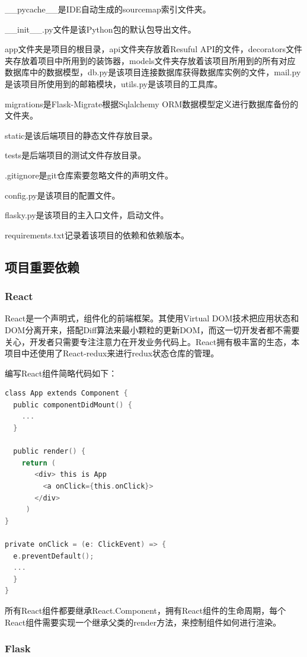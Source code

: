 \_\_pycache\_\_是IDE自动生成的sourcemap索引文件夹。

\_\_init\_\_.py文件是该Python包的默认包导出文件。

app文件夹是项目的根目录，api文件夹存放着Resuful API的文件，decorators文件夹存放着项目中所用到的装饰器，models文件夹存放着该项目所用到的所有对应数据库中的数据模型，db.py是该项目连接数据库获得数据库实例的文件，mail.py是该项目所使用到的邮箱模块，utils.py是该项目的工具库。

migrations是Flask-Migrate根据Sqlalchemy ORM数据模型定义进行数据库备份的文件夹。

static是该后端项目的静态文件存放目录。

tests是后端项目的测试文件存放目录。

.gitignore是git仓库索要忽略文件的声明文件。

config.py是该项目的配置文件。

flasky.py是该项目的主入口文件，启动文件。

requirements.txt记录着该项目的依赖和依赖版本。

\subsection{项目重要依赖}

\subsubsection{React}

React是一个声明式，组件化的前端框架。其使用Virtual DOM技术把应用状态和DOM分离开来，搭配Diff算法来最小颗粒的更新DOM，而这一切开发者都不需要关心，开发者只需要专注注意力在开发业务代码上。React拥有极丰富的生态，本项目中还使用了React-redux来进行redux状态仓库的管理。

编写React组件简略代码如下：
\begin{lstlisting}[language=C]
class App extends Component {
  public componentDidMount() {
    ...
  }

  public render() {
    return (
       <div> this is App
         <a onClick={this.onClick}>
       </div>
     )
}

private onClick = (e: ClickEvent) => {
  e.preventDefault();
  ...
  }
}
\end{lstlisting}

所有React组件都要继承React.Component，拥有React组件的生命周期，每个React组件需要实现一个继承父类的render方法，来控制组件如何进行渲染。

\subsubsection{Flask}

